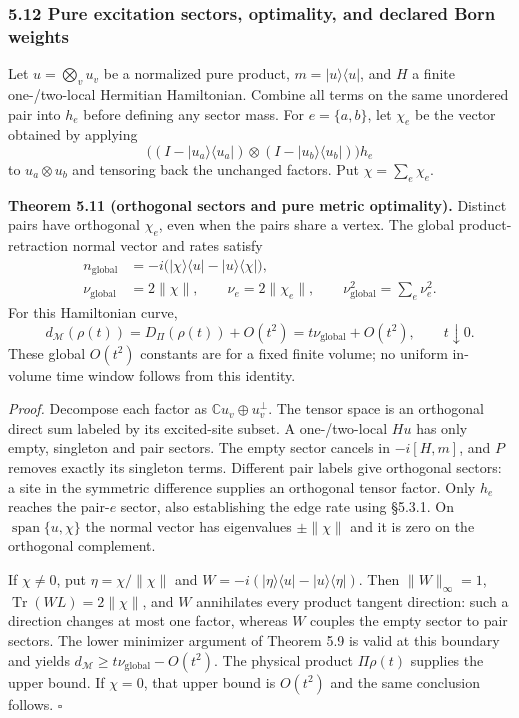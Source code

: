 \documentclass[
  11pt,
]{article}
\begin{document}
\subsubsection{5.12 Pure excitation sectors, optimality, and declared Born weights}\label{pure-excitation-sectors-optimality-and-declared-born-weights}

Let \(u=\bigotimes_vu_v\) be a normalized pure product, \(m=|u\rangle\langle u|\),
and \(H\) a finite one-/two-local Hermitian Hamiltonian. Combine all terms on the
same unordered pair into \(h_e\) before defining any sector mass. For
\(e=\{a,b\}\), let \(\chi_e\) be the vector obtained by applying
\[
\bigl((I-|u_a\rangle\langle u_a|)\otimes
      (I-|u_b\rangle\langle u_b|)\bigr)h_e
\]
to \(u_a\otimes u_b\) and tensoring back the unchanged factors. Put
\(\chi=\sum_e\chi_e\).

\textbf{Theorem 5.11 (orthogonal sectors and pure metric optimality).} Distinct pairs
have orthogonal \(\chi_e\), even when the pairs share a vertex. The global
product-retraction normal vector and rates satisfy
\[
\begin{aligned}
n_{\mathrm{global}}&=-i\bigl(|\chi\rangle\langle u|
                         -|u\rangle\langle\chi|\bigr),\\
\nu_{\mathrm{global}}&=2\lVert \chi\rVert,\qquad
\nu_e=2\lVert \chi_e\rVert,\qquad
\nu_{\mathrm{global}}^2=\sum_e\nu_e^2.
\end{aligned}
\]
For this Hamiltonian curve,
\[
d_{\mathcal M}(\rho(t))=D_\Pi(\rho(t))+O(t^2)
                     =t\nu_{\mathrm{global}}+O(t^2),\qquad t\downarrow0.
\]
These global \(O(t^2)\) constants are for a fixed finite volume; no uniform
in-volume time window follows from this identity.

\emph{Proof.} Decompose each factor as \(\mathbb Cu_v\oplus u_v^\perp\). The tensor
space is an orthogonal direct sum labeled by its excited-site subset. A
one-/two-local \(Hu\) has only empty, singleton and pair sectors. The empty
sector cancels in \(-i[H,m]\), and \(P\) removes exactly its singleton terms.
Different pair labels give orthogonal sectors: a site in the symmetric
difference supplies an orthogonal tensor factor. Only \(h_e\) reaches the
pair-\(e\) sector, also establishing the edge rate using §5.3.1. On
\(\operatorname{span}\{u,\chi\}\) the normal vector has eigenvalues
\(\pm\lVert \chi\rVert\) and it is zero on the orthogonal complement.

If \(\chi\ne0\), put \(\eta=\chi/\lVert \chi\rVert\) and
\(W=-i(|\eta\rangle\langle u|-|u\rangle\langle\eta|)\). Then
\(\lVert W\rVert_\infty=1\), \(\operatorname{Tr}(WL)=2\lVert \chi\rVert\), and \(W\)
annihilates every product tangent direction: such a direction changes at most
one factor, whereas \(W\) couples the empty sector to pair sectors. The lower
minimizer argument of Theorem 5.9 is valid at this boundary and yields
\(d_{\mathcal M}\ge t\nu_{\mathrm{global}}-O(t^2)\). The physical product
\(\Pi\rho(t)\) supplies the upper bound. If \(\chi=0\), that upper bound is
\(O(t^2)\) and the same conclusion follows. \(\square\)
\end{document}
